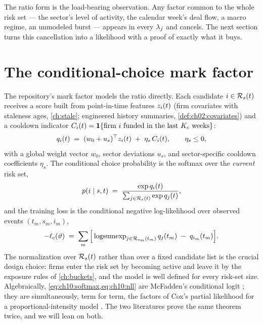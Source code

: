 The ratio form is the load-bearing observation. Any factor common to the
whole risk set --- the sector's level of activity, the calendar week's
deal flow, a macro regime, an unmodeled burst --- appears in every
$\lambda_j$ and cancels. The next section turns this cancellation into a
likelihood with a proof of exactly what it buys.

\section{The conditional-choice mark factor}\label{ch10:sec:choice}

The repository's mark factor models the ratio directly. Each candidate
$i \in \mathcal{R}_s(t)$ receives a score built from point-in-time features
$z_i(t)$ (firm covariates with staleness ages, \cref{ch:stale};
engineered history summaries, \cref{def:ch02:covariates}) and a cooldown
indicator $C_i(t) = \mathbf{1}\{\text{firm } i \text{ funded in the last } K_c
\text{ weeks}\}$:
\begin{equation}\label{eq:ch10:score}
q_i(t)
 \;=\;
 (w_0 + u_s)^{\top} z_i(t) \;+\; \eta_s\, C_i(t),
 \qquad \eta_s \le 0,
\end{equation}
with a global weight vector $w_0$, sector deviations $u_s$, and
sector-specific cooldown coefficients $\eta_s$. The conditional choice
probability is the softmax over the \emph{current} risk set,
\begin{equation}\label{eq:ch10:softmax}
p(i \mid s, t)
 \;=\;
 \frac{\exp q_i(t)}{\sum_{j \in \mathcal{R}_s(t)} \exp q_j(t)},
\end{equation}
and the training loss is the conditional negative log-likelihood over
observed events $(t_m, s_m, i_m)$,
\begin{equation}\label{eq:ch10:nll}
-\ell_{\mathrm c}(\vartheta)
 \;=\;
 \sum_{m}
 \Big[
 \operatorname{logsumexp}_{j \in \mathcal{R}_{s_m}(t_m)} q_j(t_m)
 \;-\;
 q_{i_m}(t_m)
 \Big].
\end{equation}
The normalization over $\mathcal{R}_s(t)$ rather than over a fixed candidate
list is the crucial design choice: firms enter the risk set by becoming
active and leave it by the exposure rules of \cref{ch:buckets}, and the
model is well defined for every risk-set size. Algebraically,
\cref{eq:ch10:softmax,eq:ch10:nll} are McFadden's conditional logit
\citep{mcfadden1974,train2009}; they are simultaneously, term for term,
the factors of Cox's partial likelihood for a proportional-intensity
model \citep{cox1972,cox1975}. The two literatures prove the same theorem
twice, and we will lean on both.

